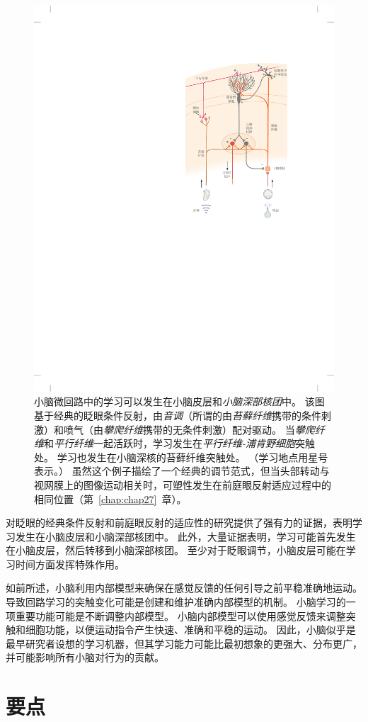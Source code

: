 \begin{figure}[htbp]
	\centering
	\includegraphics[width=0.6\linewidth]{chap37/fig_37_14}
	\caption{小脑微回路中的学习可以发生在小脑皮层和\textit{小脑深部核团}中。
		该图基于经典的眨眼条件反射，由\textit{音调}（所谓的由\textit{苔藓纤维}携带的条件刺激）和喷气（由\textit{攀爬纤维}携带的无条件刺激）配对驱动。
		当\textit{攀爬纤维}和\textit{平行纤维}一起活跃时，学习发生在\textit{平行纤维-浦肯野细胞}突触处。
		学习也发生在小脑深核的苔藓纤维突触处。
		（学习地点用星号表示。）
		虽然这个例子描绘了一个经典的调节范式，但当头部转动与视网膜上的图像运动相关时，可塑性发生在前庭眼反射适应过程中的相同位置（第~\ref{chap:chap27}~章）\cite{carey2002embarrassed}。}
	\label{fig:37_14}
\end{figure}


对眨眼的经典条件反射和前庭眼反射的适应性的研究提供了强有力的证据，表明学习发生在小脑皮层和小脑深部核团中。
此外，大量证据表明，学习可能首先发生在小脑皮层，然后转移到小脑深部核团。
至少对于眨眼调节，小脑皮层可能在学习时间方面发挥特殊作用。


如前所述，小脑利用内部模型来确保在感觉反馈的任何引导之前平稳准确地运动。
导致回路学习的突触变化可能是创建和维护准确内部模型的机制。
小脑学习的一项重要功能可能是不断调整内部模型。
小脑内部模型可以使用感觉反馈来调整突触和细胞功能，以便运动指令产生快速、准确和平稳的运动。
因此，小脑似乎是最早研究者设想的学习机器，但其学习能力可能比最初想象的更强大、分布更广，并可能影响所有小脑对行为的贡献。



\section{要点}

